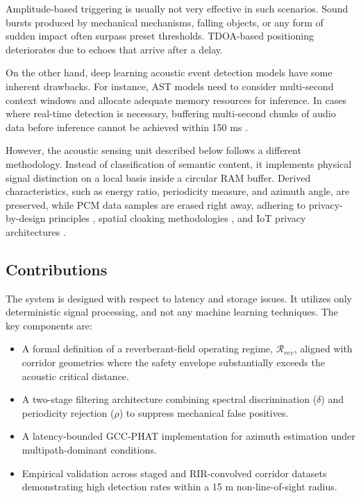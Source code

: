 \documentclass[conference]{IEEEtran}
\begin{document}
Amplitude-based triggering is usually not very effective in such scenarios. Sound bursts produced by mechanical mechanisms, falling objects, or any form of sudden impact often surpass preset thresholds. TDOA-based positioning deteriorates due to echoes that arrive after a delay.

On the other hand, deep learning acoustic event detection models have some inherent drawbacks. For instance, AST models need to consider multi-second context windows and allocate adequate memory resources for inference. In cases where real-time detection is necessary, buffering multi-second chunks of audio data before inference cannot be achieved within 150 ms \cite{b26}.

However, the acoustic sensing unit described below follows a different methodology. Instead of classification of semantic content, it implements physical signal distinction on a local basis inside a circular RAM buffer. Derived characteristics, such as energy ratio, periodicity measure, and azimuth angle, are preserved, while PCM data samples are erased right away, adhering to privacy-by-design principles \cite{b32}, spatial cloaking methodologies \cite{b21}, and IoT privacy architectures \cite{b33}.

\subsection{Contributions}
The system is designed with respect to latency and storage issues. It utilizes only deterministic signal processing, and not any machine learning techniques. The key components are:
\begin{itemize}
    \item A formal definition of a reverberant-field operating regime, $\mathcal{R}_{rev}$, aligned with corridor geometries where the safety envelope substantially exceeds the acoustic critical distance.
    \item A two-stage filtering architecture combining spectral discrimination ($\delta$) and periodicity rejection ($\rho$) to suppress mechanical false positives.
    \item A latency-bounded GCC-PHAT implementation for azimuth estimation under multipath-dominant conditions.
    \item Empirical validation across staged and RIR-convolved corridor datasets demonstrating high detection rates within a 15 m non-line-of-sight radius.
\end{itemize}
\end{document}
